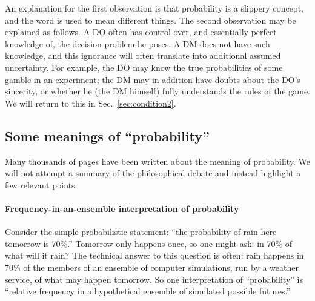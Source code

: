 \documentclass[a4paper, 12pt]{article}
\newcommand{\seclabel}[1]{\label{sec:#1}}
\newcommand{\secref}[1]{Sec.~\ref{sec:#1}}
\newcommand{\ie}{{\it i.e.}\ }
\newcommand{\eg}{{\it e.g.}\ }
\begin{document}
An explanation for the first observation is that probability is a slippery concept, and the word is used to mean different things. 
The second observation may be explained as follows. A DO often has control over, and essentially perfect knowledge of, the decision problem he poses. A DM does not have such knowledge, and this ignorance will often translate into additional assumed uncertainty. For example, the DO may know the true probabilities of some gamble in an experiment; the DM may in addition have doubts about the DO's sincerity, or whether he (the DM himself) fully understands the rules of the game. We will return to this in \secref{condition2}.

\subsection{Some meanings of ``probability'' \seclabel{tricky}}

Many thousands of pages have been written about the meaning of probability. We will not attempt a summary of the philosophical debate and instead highlight a few relevant points.


\paragraph{Frequency-in-an-ensemble interpretation of probability}
Consider the simple probabilistic statement: ``the probability of rain here tomorrow is 70\%.'' Tomorrow only happens once, so one might ask: in 70\% of what will it rain? The technical answer to this question is often: rain happens in 70\% of the members of an ensemble of computer simulations, run by a weather service, of what may happen tomorrow. So one interpretation of ``probability'' is ``relative frequency in a hypothetical ensemble of simulated possible futures.'' 
\end{document}
